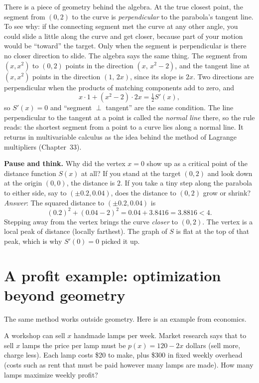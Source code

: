 \begin{connectionbox}
There is a piece of geometry behind the algebra. At the true closest point, the
segment from $(0,2)$ to the curve is \emph{perpendicular} to the parabola's tangent
line. To see why: if the connecting segment met the curve at any other
angle, you could slide a little along the curve and get closer, because part of your
motion would be ``toward'' the target. Only when the segment is perpendicular is there
no closer direction to slide. The algebra says the same thing. The segment from
$(x,x^2)$ to $(0,2)$ points in the direction $(x,\,x^2-2)$, and the tangent line at
$(x,x^2)$ points in the direction $(1,\,2x)$, since its slope is $2x$. Two directions
are perpendicular when the products of matching components add to zero, and
\[
x\cdot 1 + (x^2-2)\cdot 2x = \tfrac12 S'(x),
\]
so $S'(x)=0$ and ``segment $\perp$ tangent'' are the same condition. The line
perpendicular to the tangent at a point is called the \emph{normal line} there, so the
rule reads: the shortest segment from a point to a curve lies along a normal line. It
returns in multivariable calculus as the idea behind the method of Lagrange
multipliers (Chapter~33).
\end{connectionbox}

\begin{recoverybox}
\textbf{Pause and think.} Why did the vertex $x=0$ show up as a critical point of the
distance function $S(x)$ at all? If you stand at the target $(0,2)$ and look down at
the origin $(0,0)$, the distance is $2$. If you take a tiny step along the parabola to
either side, say to $(\pm 0.2, 0.04)$, does the distance to $(0,2)$ grow or shrink?
\emph{Answer}: The squared distance to $(\pm 0.2, 0.04)$ is
\[
(0.2)^2 + (0.04 - 2)^2 = 0.04 + 3.8416 = 3.8816 < 4.
\]
Stepping away from the vertex brings the curve \emph{closer} to $(0,2)$. The vertex is
a local peak of distance (locally farthest). The graph of $S$ is flat at the top of
that peak, which is why $S'(0)=0$ picked it up.
\end{recoverybox}

\section{A profit example: optimization beyond geometry}

The same method works outside geometry. Here is an example from economics.

\begin{example}\label{ch17:ex-profit}
A workshop can sell $x$ handmade lamps per week. Market research says that to sell $x$
lamps the price per lamp must be $p(x) = 120 - 2x$ dollars (sell more, charge less).
Each lamp costs \$20 to make, plus \$300 in fixed weekly overhead (costs such as rent
that must be paid however many lamps are made). How many lamps
maximize weekly profit?
\end{example}

